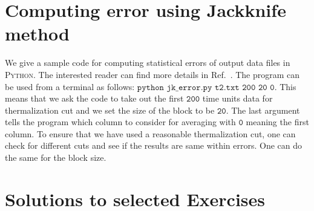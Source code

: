\documentclass[letter,11pt]{article}
\newcommand{\PY}{\textsc{Python}}
\begin{document}
\section{\label{sec:jk_code}Computing error using Jackknife method}
We give a sample code for computing statistical errors of output data files in \PY. The interested reader can find more details in Ref.~\cite{2012arXiv1210.3781Y}. The program can be used from a terminal as follows: 
$\texttt{python jk\_error.py t2.txt 200 20 0}$. 
This means that we ask the code to take out the first $\texttt{200}$ time units data for thermalization cut and we set the size of the block to be $\texttt{20}$. The last argument tells the program which column to consider for averaging with $\texttt{0}$ meaning the first column. To ensure that we have used a reasonable thermalization cut, one can check for different cuts and see if the results 
are same within errors. One can do the same for the block size. 
	\begin{mdframed}[backgroundcolor=mauve!3] 
			
	\end{mdframed} 

\section{\label{sec:solutions}Solutions to selected Exercises} 
\end{document}
